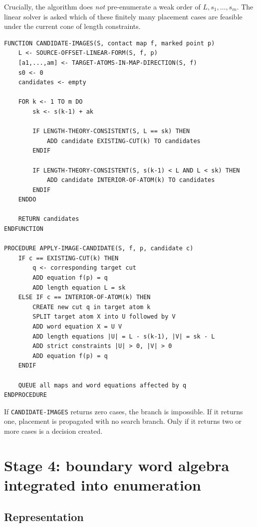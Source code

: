 \documentclass[11pt]{article}
\begin{document}
Crucially, the algorithm does \emph{not} pre-enumerate a weak order of $L,s_1,\ldots,s_m$.  The linear solver is asked which of these finitely many placement cases are feasible under the current cone of length constraints.

\begin{lstlisting}[caption={Lazy mapping of one marked point.},label={alg:map-point}]
FUNCTION CANDIDATE-IMAGES(S, contact map f, marked point p)
    L <- SOURCE-OFFSET-LINEAR-FORM(S, f, p)
    [a1,...,am] <- TARGET-ATOMS-IN-MAP-DIRECTION(S, f)
    s0 <- 0
    candidates <- empty

    FOR k <- 1 TO m DO
        sk <- s(k-1) + ak

        IF LENGTH-THEORY-CONSISTENT(S, L == sk) THEN
            ADD candidate EXISTING-CUT(k) TO candidates
        ENDIF

        IF LENGTH-THEORY-CONSISTENT(S, s(k-1) < L AND L < sk) THEN
            ADD candidate INTERIOR-OF-ATOM(k) TO candidates
        ENDIF
    ENDDO

    RETURN candidates
ENDFUNCTION

PROCEDURE APPLY-IMAGE-CANDIDATE(S, f, p, candidate c)
    IF c == EXISTING-CUT(k) THEN
        q <- corresponding target cut
        ADD equation f(p) = q
        ADD length equation L = sk
    ELSE IF c == INTERIOR-OF-ATOM(k) THEN
        CREATE new cut q in target atom k
        SPLIT target atom X into U followed by V
        ADD word equation X = U V
        ADD length equations |U| = L - s(k-1), |V| = sk - L
        ADD strict constraints |U| > 0, |V| > 0
        ADD equation f(p) = q
    ENDIF

    QUEUE all maps and word equations affected by q
ENDPROCEDURE
\end{lstlisting}

If \texttt{CANDIDATE-IMAGES} returns zero cases, the branch is impossible.  If it returns one, placement is propagated with no search branch.  Only if it returns two or more cases is a decision created.

\section{Stage 4: boundary word algebra integrated into enumeration}
\label{sec:word}

\subsection{Representation}
\end{document}
